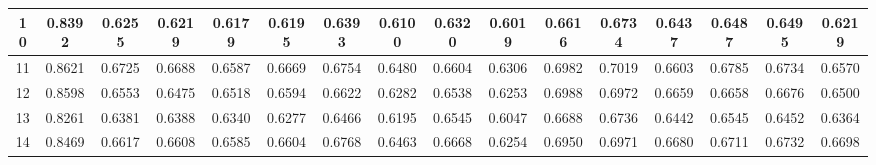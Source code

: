 \documentclass[12pt]{jarticle}
\begin{document}
\begin{table}[ht]
{\begin{tabular}{|c|c|c|c|c|c|c|c|c|c|c|c|c|c|c|c|}
        \multicolumn{1}{|c|}{10} & 0.8392 & 0.6255 & 0.6219 & 0.6179 & 0.6195 & 0.6393 & 0.6100 & 0.6320 & 0.6019 & 0.6616 & 0.6734 & 0.6437 & 0.6487 & 0.6495 & 0.6219 \\ \hline
        \multicolumn{1}{|c|}{11} & 0.8621 & 0.6725 & 0.6688 & 0.6587 & 0.6669 & 0.6754 & 0.6480 & 0.6604 & 0.6306 & 0.6982 & 0.7019 & 0.6603 & 0.6785 & 0.6734 & 0.6570 \\ \hline
        \multicolumn{1}{|c|}{12} & 0.8598 & 0.6553 & 0.6475 & 0.6518 & 0.6594 & 0.6622 & 0.6282 & 0.6538 & 0.6253 & 0.6988 & 0.6972 & 0.6659 & 0.6658 & 0.6676 & 0.6500 \\ \hline
        \multicolumn{1}{|c|}{13} & 0.8261 & 0.6381 & 0.6388 & 0.6340 & 0.6277 & 0.6466 & 0.6195 & 0.6545 & 0.6047 & 0.6688 & 0.6736 & 0.6442 & 0.6545 & 0.6452 & 0.6364 \\ \hline
        \multicolumn{1}{|c|}{14} & 0.8469 & 0.6617 & 0.6608 & 0.6585 & 0.6604 & 0.6768 & 0.6463 & 0.6668 & 0.6254 & 0.6950 & 0.6971 & 0.6680 & 0.6711 & 0.6732 & 0.6698 \\ \hline
        \end{tabular}
    }
    
    \end{table}
\end{document}
